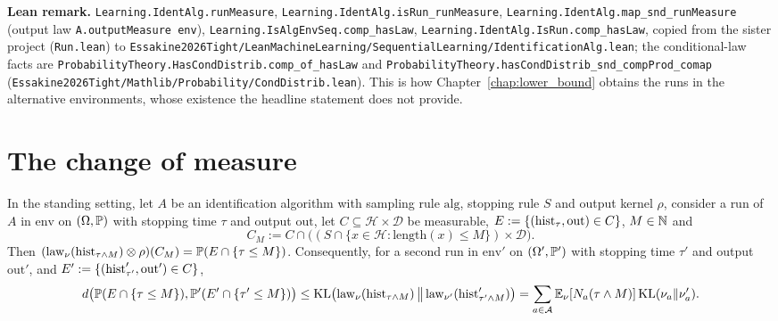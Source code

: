 \textbf{Lean remark.} \texttt{Learning.IdentAlg.runMeasure},
\texttt{Learning.IdentAlg.isRun\_runMeasure}, \texttt{Learning.IdentAlg.map\_snd\_runMeasure}
(output law \texttt{A.outputMeasure env}), \texttt{Learning.IsAlgEnvSeq.comp\_hasLaw},
\texttt{Learning.IdentAlg.IsRun.comp\_hasLaw}, copied from the sister project (\texttt{Run.lean})
to \texttt{Essakine2026Tight/LeanMachineLearning/SequentialLearning/IdentificationAlg.lean}; the
conditional-law facts are \texttt{ProbabilityTheory.HasCondDistrib.comp\_of\_hasLaw} and
\texttt{ProbabilityTheory.hasCondDistrib\_snd\_compProd\_comap}
(\texttt{Essakine2026Tight/Mathlib/Probability/CondDistrib.lean}). This is how
Chapter~\ref{chap:lower_bound} obtains the runs in the alternative environments, whose
existence the headline statement does not provide.

\section{The change of measure}
\label{sec:pinfo_change_of_measure}

\begin{lemma}\label{lem:pinfo_truncated_pair}
\leanok
{}
In the standing setting, let $A$ be an identification algorithm with sampling rule
$\mathrm{alg}$, stopping rule $S$ and output kernel $\rho$, consider a run of $A$ in
$\mathrm{env}$ on $(\Omega,\mathbb{P})$ with stopping time $\tau$ and output $\mathrm{out}$, let
$C \subseteq \mathcal H\times\mathcal D$ be measurable, $E := \{(\mathrm{hist}_\tau, \mathrm{out}) \in C\}$,
$M \in \mathbb{N}$ and
\[
  C_M := C \cap \big((S \cap \{x \in \mathcal H : \mathrm{length}(x) \le M\}) \times \mathcal D\big).
\]
Then $(\mathrm{law}_\nu(\mathrm{hist}_{\tau\wedge M}) \otimes \rho)(C_M) = \mathbb{P}(E \cap \{\tau \le M\})$.
Consequently, for a second run in $\mathrm{env}'$ on $(\Omega', \mathbb{P}')$ with stopping time $\tau'$
and output $\mathrm{out}'$, and $E' := \{(\mathrm{hist}'_{\tau'}, \mathrm{out}') \in C\}$,
\[
  d\big(\mathbb{P}(E \cap \{\tau \le M\}), \mathbb{P}'(E' \cap \{\tau' \le M\})\big)
  \le \mathrm{KL}\big(\mathrm{law}_\nu(\mathrm{hist}_{\tau\wedge M})\,\big\|\,\mathrm{law}_{\nu'}(\mathrm{hist}'_{\tau'\wedge M})\big)
  = \sum_{a\in\mathcal{A}}\mathbb{E}_\nu[N_a(\tau\wedge M)]\,\mathrm{KL}(\nu_a\|\nu'_a) .
\]
\end{lemma}

